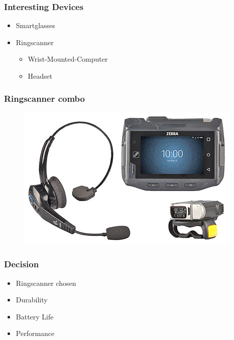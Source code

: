 \begin{frame}\frametitle{Interesting Devices}
	\begin{itemize}
		\item Smartglasses
		\item Ringscanner
		\begin{itemize}
			\item Wrist-Mounted-Computer
			\item Headset
		\end{itemize}
	\end{itemize}
\end{frame}

\begin{frame}\frametitle{Ringscanner combo}
	\begin{figure}
		\includegraphics[height=.8\textheight]{images/zebra_wt6000_all}
	\end{figure}
\end{frame}

\begin{frame}\frametitle{Decision}
	\begin{itemize}
		\item Ringscanner chosen
	\end{itemize}
	\begin{itemize}
		\item Durability
		\item Battery Life
		\item Performance
	\end{itemize}
\end{frame}